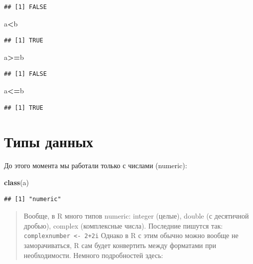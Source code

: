 \documentclass[]{book}
\newenvironment{Shaded}{\begin{snugshade}}{\end{snugshade}}
\newcommand{\KeywordTok}[1]{\textcolor[rgb]{0.13,0.29,0.53}{\textbf{#1}}}
\newcommand{\NormalTok}[1]{#1}
\newcommand{\OperatorTok}[1]{\textcolor[rgb]{0.81,0.36,0.00}{\textbf{#1}}}
\begin{document}
\begin{verbatim}
## [1] FALSE
\end{verbatim}

\begin{Shaded}
\begin{Highlighting}[]
\NormalTok{a}\OperatorTok{<}\NormalTok{b}
\end{Highlighting}
\end{Shaded}

\begin{verbatim}
## [1] TRUE
\end{verbatim}

\begin{Shaded}
\begin{Highlighting}[]
\NormalTok{a}\OperatorTok{>=}\NormalTok{b}
\end{Highlighting}
\end{Shaded}

\begin{verbatim}
## [1] FALSE
\end{verbatim}

\begin{Shaded}
\begin{Highlighting}[]
\NormalTok{a}\OperatorTok{<=}\NormalTok{b}
\end{Highlighting}
\end{Shaded}

\begin{verbatim}
## [1] TRUE
\end{verbatim}

\hypertarget{data_types}{%
\section{Типы данных}\label{data_types}}

До этого момента мы работали только с числами (numeric):

\begin{Shaded}
\begin{Highlighting}[]
\KeywordTok{class}\NormalTok{(a)}
\end{Highlighting}
\end{Shaded}

\begin{verbatim}
## [1] "numeric"
\end{verbatim}

\begin{quote}
Вообще, в R много типов numeric: integer (целые), double (с десятичной дробью), complex (комплексные числа). Последние пишутся так: \texttt{complexnumber\ \textless{}-\ 2+2i}
Однако в R с этим обычно можно вообще не заморачиваться, R сам будет конвертить между форматами при необходимости. Немного подробностей здесь:
\end{quote}
\end{document}
